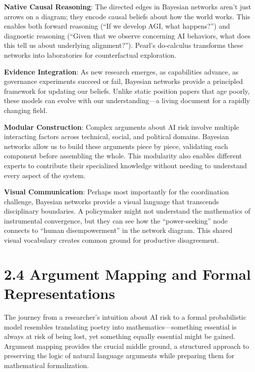 \documentclass[
  11pt,
  letterpaper,
  openany]{book}
\begin{document}
\textbf{Native Causal Reasoning}: The directed edges in Bayesian
networks aren't just arrows on a diagram; they encode causal beliefs
about how the world works. This enables both forward reasoning (``If we
develop AGI, what happens?'') and diagnostic reasoning (``Given that we
observe concerning AI behaviors, what does this tell us about underlying
alignment?''). Pearl's do-calculus \textcite{pearl2009} transforms these
networks into laboratories for counterfactual exploration.

\textbf{Evidence Integration}: As new research emerges, as capabilities
advance, as governance experiments succeed or fail, Bayesian networks
provide a principled framework for updating our beliefs. Unlike static
position papers that age poorly, these models can evolve with our
understanding---a living document for a rapidly changing field.

\textbf{Modular Construction}: Complex arguments about AI risk involve
multiple interacting factors across technical, social, and political
domains. Bayesian networks allow us to build these arguments piece by
piece, validating each component before assembling the whole. This
modularity also enables different experts to contribute their
specialized knowledge without needing to understand every aspect of the
system.

\textbf{Visual Communication}: Perhaps most importantly for the
coordination challenge, Bayesian networks provide a visual language that
transcends disciplinary boundaries. A policymaker might not understand
the mathematics of instrumental convergence, but they can see how the
``power-seeking'' node connects to ``human disempowerment'' in the
network diagram. This shared visual vocabulary creates common ground for
productive disagreement.

\section{2.4 Argument Mapping and Formal
Representations}\label{sec-argument-mapping}

The journey from a researcher's intuition about AI risk to a formal
probabilistic model resembles translating poetry into
mathematics---something essential is always at risk of being lost, yet
something equally essential might be gained. Argument mapping provides
the crucial middle ground, a structured approach to preserving the logic
of natural language arguments while preparing them for mathematical
formalization.
\end{document}
